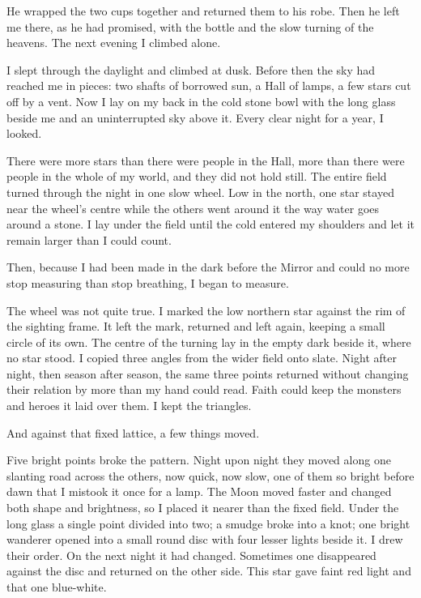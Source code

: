 He wrapped the two cups together and returned them to his robe. Then he left me there, as he had promised, with the bottle and the slow turning of the heavens. The next evening I climbed alone.\par

I slept through the daylight and climbed at dusk. Before then the sky had reached me in pieces: two shafts of borrowed sun, a Hall of lamps, a few stars cut off by a vent. Now I lay on my back in the cold stone bowl with the long glass beside me and an uninterrupted sky above it. Every clear night for a year, I looked.\par

There were more stars than there were people in the Hall, more than there were people in the whole of my world, and they did not hold still. The entire field turned through the night in one slow wheel. Low in the north, one star stayed near the wheel's centre while the others went around it the way water goes around a stone. I lay under the field until the cold entered my shoulders and let it remain larger than I could count.\par

Then, because I had been made in the dark before the Mirror and could no more stop measuring than stop breathing, I began to measure.\par

The wheel was not quite true. I marked the low northern star against the rim of the sighting frame. It left the mark, returned and left again, keeping a small circle of its own. The centre of the turning lay in the empty dark beside it, where no star stood. I copied three angles from the wider field onto slate. Night after night, then season after season, the same three points returned without changing their relation by more than my hand could read. Faith could keep the monsters and heroes it laid over them. I kept the triangles.\par

And against that fixed lattice, a few things moved.\par

Five bright points broke the pattern. Night upon night they moved along one slanting road across the others, now quick, now slow, one of them so bright before dawn that I mistook it once for a lamp. The Moon moved faster and changed both shape and brightness, so I placed it nearer than the fixed field. Under the long glass a single point divided into two; a smudge broke into a knot; one bright wanderer opened into a small round disc with four lesser lights beside it. I drew their order. On the next night it had changed. Sometimes one disappeared against the disc and returned on the other side. This star gave faint red light and that one blue-white.\par

